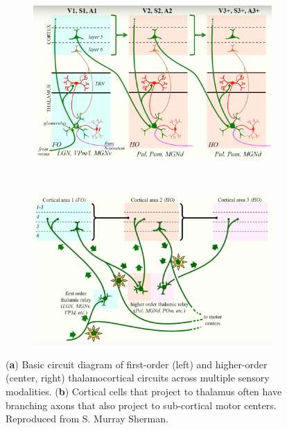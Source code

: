 \begin{figure}[h!]
    \centering
    \begin{subfigure}[t]{0.5\textwidth}
        \centering
        \includegraphics[width=\textwidth]{images/neuroscience/thalamocortical_circuits.png}
        \caption{ }
        \label{fig: thalamocortical circuits}
    \end{subfigure}%
    ~ 
    \begin{subfigure}[t]{0.5\textwidth}
        \centering
        \includegraphics[width=\textwidth]{images/neuroscience/thalamus_branching_axons.png}
        \caption{ }
        \label{fig: thalamus branching axons}
    \end{subfigure}
    \caption{(\textbf{a}) Basic circuit diagram of first-order (left) and higher-order (center, right) thalamocortical circuits across multiple sensory modalities. (\textbf{b}) Cortical cells that project to thalamus often have branching axons that also project to sub-cortical motor centers. Reproduced from S. Murray Sherman.}
\end{figure}


